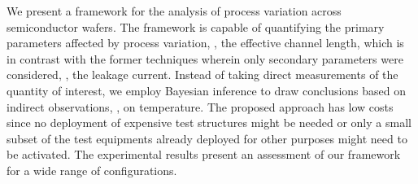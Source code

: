 We present a framework for the analysis of process variation across semiconductor wafers.
The framework is capable of quantifying the primary parameters affected by process variation, \eg, the effective channel length, which is in contrast with the former techniques wherein only secondary parameters were considered, \eg, the leakage current.
Instead of taking direct measurements of the quantity of interest, we employ Bayesian inference to draw conclusions based on indirect observations, \eg, on temperature.
The proposed approach has low costs since no deployment of expensive test structures might be needed or only a small subset of the test equipments already deployed for other purposes might need to be activated.
The experimental results present an assessment of our framework for a wide range of configurations.

